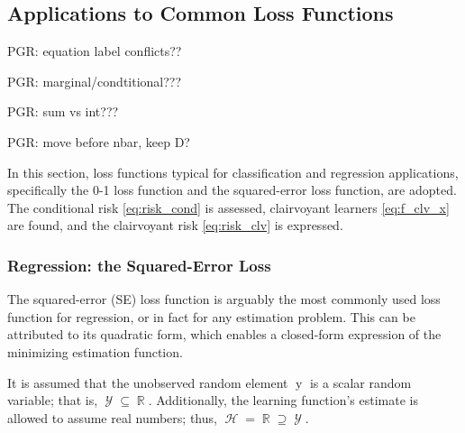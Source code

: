 \documentclass[12pt]{article}
\DeclareMathOperator{\yrm}{\mathrm{y}}
\DeclareMathOperator{\Ycal}{\mathcal{Y}}
\DeclareMathOperator{\Hcal}{\mathcal{H}}
\DeclareMathOperator{\Rbb}{\mathbb{R}}
\begin{document}
\subsection{Applications to Common Loss Functions}

PGR: equation label conflicts??

PGR: marginal/condtitional???

PGR: sum vs int???

PGR: move before nbar, keep D?



In this section, loss functions typical for classification and regression applications, specifically the 0-1 loss function and the squared-error loss function, are adopted. The conditional risk \eqref{eq:risk_cond} is assessed, clairvoyant learners \eqref{eq:f_clv_x} are found, and the clairvoyant risk \eqref{eq:risk_clv} is expressed.



\subsubsection{Regression: the Squared-Error Loss}

The squared-error (SE) loss function is arguably the most commonly used loss function for regression, or in fact for any estimation problem. This can be attributed to its quadratic form, which enables a closed-form expression of the minimizing estimation function.

It is assumed that the unobserved random element $\yrm$ is a scalar random variable; that is, $\Ycal \subseteq \Rbb$. Additionally, the learning function's estimate is allowed to assume real numbers; thus, $\Hcal = \Rbb \supseteq \Ycal$.
\end{document}
